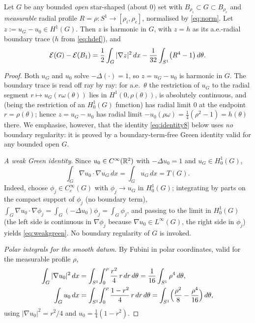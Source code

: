 \begin{lemma}\label{lem:identity}
Let $G$ be any bounded \emph{open} star-shaped \textup{(}about $0$\textup{)}
set with $B_{\rho_i}\subset G\subset B_{\rho_e}$ and \emph{measurable} radial
profile $R=\rho\colon S^1\to[\rho_i,\rho_e]$, normalised by \eqref{eq:norm}.
Let $z:=u_G-u_0\in H^1(G)$. Then $z$ is harmonic in $G$, with $z=h$ as its
a.e.-radial boundary trace \textup{(}$h$ from \eqref{eq:hdef}\textup{)}, and
\begin{equation}\label{eq:identity8}
   \mathcal E(G)-\mathcal E(B_1)
   =\frac12\int_G|\nabla z|^2\,d x
     -\frac1{32}\int_{S^1}\bigl(R^4-1\bigr)\,d\theta .
\end{equation}
\end{lemma}

\begin{proof}
Both $u_G$ and $u_0$ solve $-\Delta(\cdot)=1$, so $z=u_G-u_0$ is harmonic in
$G$. The boundary trace is read off ray by ray: for a.e.\ $\theta$ the
restriction of $u_G$ to the radial segment $r\mapsto u_G(r\omega(\theta))$
lies in $H^1(0,\rho(\theta))$, is absolutely continuous, and (being the
restriction of an $H^1_0(G)$ function) has radial limit $0$ at the endpoint
$r=\rho(\theta)$; hence $z=u_G-u_0$ has radial limit $-u_0(\rho\omega)
=\tfrac14(\rho^2-1)=h(\theta)$ there. We emphasise, however, that the
identity \eqref{eq:identity8} below uses \emph{no} boundary regularity: it is
proved by a boundary-term-free Green identity valid for any bounded open $G$.

\emph{A weak Green identity.}
Since $u_0\in C^\infty(\mathbb{R}^2)$ with $-\Delta u_0=1$ and $u_G\in H^1_0(G)$,
\begin{equation}\label{eq:weakgreen}
   \int_G\nabla u_0\cdot\nabla u_G\,dx=\int_G u_G\,dx=T(G).
\end{equation}
Indeed, choose $\phi_j\in C_c^\infty(G)$ with $\phi_j\to u_G$ in $H^1_0(G)$;
integrating by parts on the compact support of $\phi_j$ (no boundary term),
$\int_G\nabla u_0\cdot\nabla\phi_j=\int_G(-\Delta u_0)\phi_j=\int_G\phi_j$,
and passing to the limit in $H^1_0(G)$ (the left side is continuous in
$\nabla\phi_j$ because $\nabla u_0\in L^\infty(G)$, the right side in
$\phi_j$) yields \eqref{eq:weakgreen}. No boundary regularity of $G$ is
invoked.

\emph{Polar integrals for the smooth datum.}
By Fubini in polar coordinates, valid for the measurable profile $\rho$,
\begin{align}
   \int_G|\nabla u_0|^2\,dx
      &=\int_{S^1}\!\int_0^{\rho}\frac{r^2}4\,r\,dr\,d\theta
      =\frac1{16}\int_{S^1}\rho^4\,d\theta,
      \label{eq:polar-grad}\\
   \int_G u_0\,dx
      &=\int_{S^1}\!\int_0^{\rho}\frac{1-r^2}4\,r\,dr\,d\theta
      =\int_{S^1}\Bigl(\frac{\rho^2}8-\frac{\rho^4}{16}\Bigr)\,d\theta,
      \label{eq:polar-u0}
\end{align}
using $|\nabla u_0|^2=r^2/4$ and $u_0=\tfrac14(1-r^2)$.


\end{proof}
